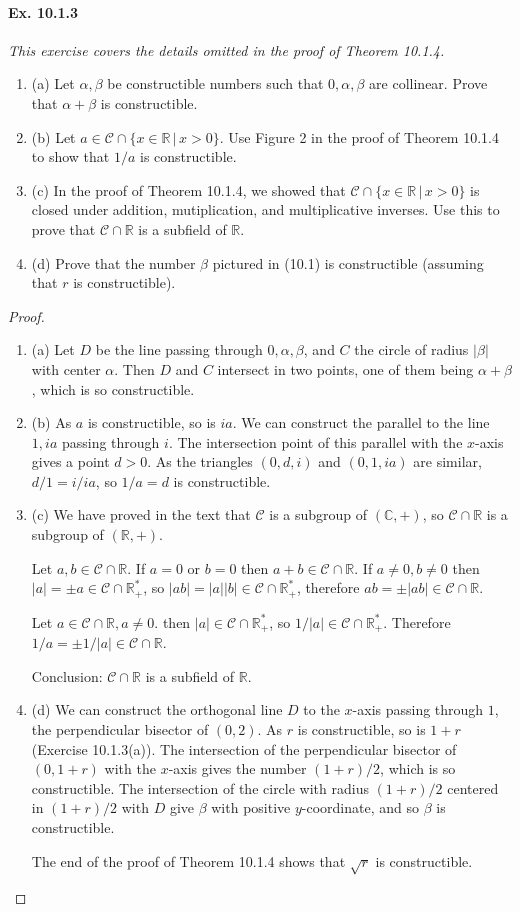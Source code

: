 \documentclass[11pt,a4paper]{article}
\newcommand{\be} {\begin{enumerate}}
\newcommand{\ee} {\end{enumerate}}
\newcommand{\R}{\mathbb{R}}
\newcommand{\C}{\mathbb{C}}
\begin{document}
\paragraph{Ex. 10.1.3}

{\it This exercise covers the details omitted in the proof of Theorem 10.1.4.
\be
\item[(a)] Let $\alpha,\beta$ be constructible numbers such that $0,\alpha,\beta$ are collinear. Prove that $\alpha+\beta$ is constructible.
\item[(b)] Let $a\in {\mathscr{C}} \cap \{x\in \R\, | \, x>0\}$. Use Figure 2 in the proof of Theorem 10.1.4 to show that $1/a$ is constructible.
\item[(c)] In the proof of Theorem 10.1.4, we showed that ${\mathscr{C}} \cap  \{x\in \R\, | \, x>0\}$ is closed under addition, mutiplication, and multiplicative inverses. Use this to prove that ${\mathscr{C}} \cap \R$ is a subfield of $\R$.
\item[(d)] Prove that the number $\beta$ pictured in (10.1) is constructible (assuming that $r$ is constructible).
\ee
}

\begin{proof}
\be
\item[(a)] Let $D$ be the line passing through $0,\alpha,\beta$, and $C$ the circle of radius $|\beta|$ with center $\alpha$. Then $D$ and $C$ intersect in two points, one of them being $\alpha + \beta$, which is so constructible.
\item[(b)] As $a$ is constructible, so is $ia$. We can construct the parallel to the line $1,ia$ passing through $i$. The intersection point of this parallel with the $x$-axis gives a point $d>0$. As the triangles $(0,d,i)$ and $(0,1,ia)$ are similar, $d/1 = i/ia$, so $1/a = d$ is constructible.
\item[(c)] We have proved in the text that $\mathscr{C}$ is a subgroup of $(\C,+)$, so ${\mathscr{C}} \cap \R$ is a subgroup of $(\R,+)$.

Let $a,b\in {\mathscr{C}} \cap \R$. If $a = 0$ or $b = 0$ then $a+b \in  {\mathscr{C}} \cap \R$. If $a \ne 0, b\ne 0$ then $|a| = \pm a \in {\mathscr{C}} \cap \R_+^*$, so $|ab| = |a| |b| \in  {\mathscr{C}} \cap \R_+^*$, therefore $ab =\pm |ab| \in {\mathscr{C}} \cap \R$.

Let $a \in {\mathscr{C}} \cap \R, a\ne 0$. then $| a | \in {\mathscr{C}} \cap \R_+^*$, so $1/|a| \in {\mathscr{C}} \cap \R_+^*$. Therefore $1/a = \pm 1/|a| \in {\mathscr{C}} \cap \R$.

Conclusion: ${\mathscr{C}} \cap \R$ is a subfield of $\R$.
\item[(d)] We can construct the orthogonal line $D$ to the $x$-axis passing through $1$, the perpendicular bisector of $(0,2)$. As $r$ is constructible, so is $1+r$ (Exercise 10.1.3(a)). The intersection of the perpendicular bisector of $(0,1+r)$ with the $x$-axis gives the number $(1+r)/2$, which is so constructible. The intersection of the circle with radius $(1+r)/2$ centered in $(1+r)/2$ with $D$ give $\beta$ with positive $y$-coordinate, and so $\beta$ is constructible.

The end of the proof of Theorem 10.1.4 shows that $\sqrt{r}$ is constructible.
\ee
\end{proof}
\end{document}
